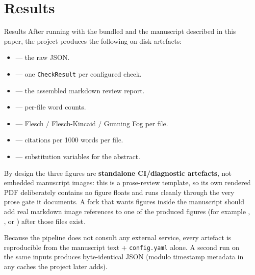 \documentclass[
  ignorenonframetext,
]{beamer}
\author{\texorpdfstring{}{}}
\date{}
\providecommand{\tightlist}{%
  \setlength{\itemsep}{0pt}\setlength{\parskip}{0pt}}
\begin{document}
\section{Results}\label{sec:results}

\begin{frame}{Results}
After running  with the bundled
 and the manuscript described in this
paper, the project produces the following on-disk artefacts:

\begin{itemize}
\tightlist
\item
   --- the raw
   JSON.
\item
   --- one \texttt{CheckResult} per
  configured check.
\item
   --- the assembled markdown review
  report.
\item
   --- per-file word
  counts.
\item
   --- Flesch /
  Flesch-Kincaid / Gunning Fog per file.
\item
   --- citations per 1000
  words per file.
\item
   --- substitution
  variables for the abstract.
\end{itemize}

By design the three figures are \textbf{standalone CI/diagnostic
artefacts}, not embedded manuscript images: this is a prose-review
template, so its own rendered PDF deliberately contains no figure floats
and runs cleanly through the very prose gate it documents. A fork that
wants figures inside the manuscript should add real markdown image
references to one of the produced figures (for example
,
, or
) after those files exist.

Because the pipeline does not consult any external service, every
artefact is reproducible from the manuscript text + \texttt{config.yaml}
alone. A second run on the same inputs produces byte-identical JSON
(modulo timestamp metadata in any caches the project later adds).


\end{frame}
\end{document}
